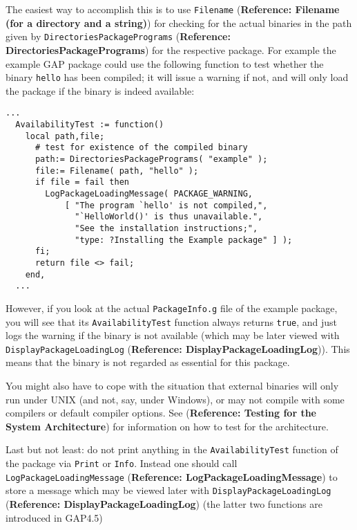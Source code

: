 \documentclass[a4paper,11pt]{report}
\begin{document}
{{{ The easiest way to accomplish this is to use \texttt{Filename} (\textbf{Reference: Filename (for a directory and a string)}) for checking for the actual binaries in the path given by \texttt{DirectoriesPackagePrograms} (\textbf{Reference: DirectoriesPackagePrograms}) for the respective package. For example the \textsf{example} \textsf{GAP} package could use the following function to test whether the binary \texttt{hello} has been compiled; it will issue a warning if not, and will only load the
package if the binary is indeed available: 

 
\begin{Verbatim}[commandchars=!@|,fontsize=\small,frame=single,label=Example]
  ...
  AvailabilityTest := function()
    local path,file;
      # test for existence of the compiled binary
      path:= DirectoriesPackagePrograms( "example" );
      file:= Filename( path, "hello" );
      if file = fail then
        LogPackageLoadingMessage( PACKAGE_WARNING,
            [ "The program `hello' is not compiled,",
              "`HelloWorld()' is thus unavailable.",
              "See the installation instructions;",
              "type: ?Installing the Example package" ] );
      fi;
      return file <> fail;
    end,
  ...
\end{Verbatim}
 

 However, if you look at the actual \texttt{PackageInfo.g} file of the \textsf{example} package, you will see that its \texttt{AvailabilityTest} function always returns \texttt{true}, and just logs the warning if the binary is not available (which may be later
viewed with \texttt{DisplayPackageLoadingLog} (\textbf{Reference: DisplayPackageLoadingLog})). This means that the binary is not regarded as essential for this package. 

 You might also have to cope with the situation that external binaries will
only run under UNIX (and not, say, under Windows), or may not compile with
some compilers or default compiler options. See{\nobreakspace} (\textbf{Reference: Testing for the System Architecture}) for information on how to test for the architecture. 

  Last but not least: do not print anything in the \texttt{AvailabilityTest} function of the package via \texttt{Print} or \texttt{Info}. Instead one should call \texttt{LogPackageLoadingMessage} (\textbf{Reference: LogPackageLoadingMessage}) to store a message which may be viewed later with \texttt{DisplayPackageLoadingLog} (\textbf{Reference: DisplayPackageLoadingLog}) (the latter two functions are introduced in \textsf{GAP}{\nobreakspace}4.5) }

}}
\end{document}
